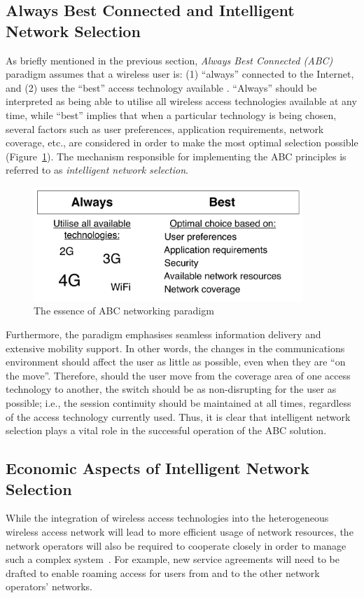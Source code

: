 \subsection{Always Best Connected and Intelligent Network Selection} %
\label{sub:always_best_connected_and_intelligent_network_selection_intelligent}
As briefly mentioned in the previous section, \emph{Always Best Connected (ABC)} paradigm assumes that a wireless user is: (1) ``always'' connected to the Internet, and (2) uses the ``best'' access technology available \cite{ABC03}. ``Always'' should be interpreted as being able to utilise all wireless access technologies available at any time, while ``best'' implies that when a particular technology is being chosen, several factors such as user preferences, application requirements, network coverage, etc., are considered in order to make the most optimal selection possible (Figure~\ref{fig:abc_intelligent}). The mechanism responsible for implementing the ABC principles is referred to as \emph{intelligent network selection}.

\begin{figure}[t]
    \centering
    \includegraphics[width=4in]{Intelligent/Figures/abc}
    \caption{The essence of ABC networking paradigm}
    \label{fig:abc_intelligent}
\end{figure}

Furthermore, the paradigm emphasises seamless information delivery and extensive mobility support. In other words, the changes in the communications environment should affect the user as little as possible, even when they are ``on the move''. Therefore, should the user move from the coverage area of one access technology to another, the switch should be as non-disrupting for the user as possible; i.e., the session continuity should be maintained at all times, regardless of the access technology currently used. Thus, it is clear that intelligent network selection plays a vital role in the successful operation of the ABC solution.

\subsection{Economic Aspects of Intelligent Network Selection} %
\label{sub:economic_aspects_of_intelligent_network_selection_intelligent}
While the integration of wireless access technologies into the heterogeneous wireless access network will lead to more efficient usage of network resources, the network operators will also be required to cooperate closely in order to manage such a complex system~\cite{HossainBeaubrun09,HossainTalebiFard09}. For example, new service agreements will need to be drafted to enable roaming access for users from and to the other network operators' networks.

